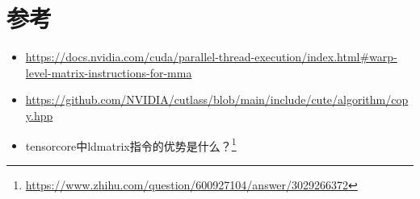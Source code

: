 \section{参考}

\begin{itemize}
  \item \url{https://docs.nvidia.com/cuda/parallel-thread-execution/index.html#warp-level-matrix-instructions-for-mma}
  \item \url{https://github.com/NVIDIA/cutlass/blob/main/include/cute/algorithm/copy.hpp}
  \item tensorcore中ldmatrix指令的优势是什么？\footnote{\url{https://www.zhihu.com/question/600927104/answer/3029266372}}
\end{itemize}
